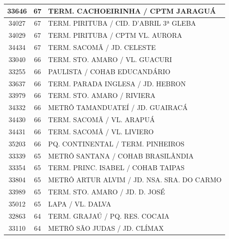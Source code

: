 \documentclass[
	12pt,				%
	oneside,			%
	a4paper,			%
	english,			%
	brazil				%
	]{abntex2ppgsi}
\begin{document}
\begin{apendicesenv}
\begin{longtable}{c|c|p{7cm}}
    33646 & 67    & TERM. CACHOEIRINHA / CPTM JARAGUÁ \\
\hline

    34027 & 67    & TERM. PIRITUBA / CID. D'ABRIL 3ª GLEBA \\
\hline

    34029 & 67    & TERM. PIRITUBA / CPTM VL. AURORA \\
\hline

    34434 & 67    & TERM. SACOMÃ / JD. CELESTE \\
\hline

    33040 & 66    & TERM. STO. AMARO / VL. GUACURI \\
\hline

    33255 & 66    & PAULISTA / COHAB EDUCANDÁRIO \\
\hline

    33637 & 66    & TERM. PARADA INGLESA / JD. HEBRON \\
\hline

    33979 & 66    & TERM. STO. AMARO / RIVIERA \\
\hline

    34332 & 66    & METRÔ TAMANDUATEÍ / JD. GUAIRACÁ \\
\hline

    34430 & 66    & TERM. SACOMÃ / VL. ARAPUÁ \\
\hline

    34431 & 66    & TERM. SACOMÃ / VL. LIVIERO \\
\hline

    35203 & 66    & PQ. CONTINENTAL / TERM. PINHEIROS \\
\hline

    33339 & 65    & METRÔ SANTANA / COHAB BRASILÂNDIA \\
\hline

    33354 & 65    & TERM. PRINC. ISABEL / COHAB TAIPAS \\
\hline

    33804 & 65    & METRÔ ARTUR ALVIM / JD. NSA. SRA. DO CARMO \\
\hline

    33989 & 65    & TERM. STO. AMARO / JD. D. JOSÉ \\
\hline

    35012 & 65    & LAPA / VL. DALVA \\
\hline

    32863 & 64    & TERM. GRAJAÚ / PQ. RES. COCAIA \\
\hline

    33110 & 64    & METRÔ SÃO JUDAS / JD. CLÍMAX \\
\hline


\end{longtable}
\end{apendicesenv}
\end{document}
